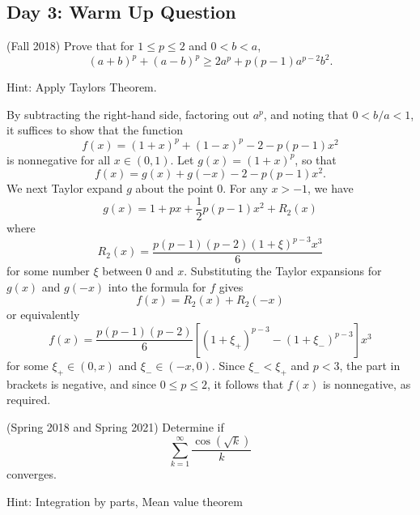 \documentclass[answers]{exam}
\theoremstyle{problemstyle}
\newcommand{\1}[1]{\textbf{1}_{\left[#1\right]}} %
\def\blue{\color{Blue}}
\newcommand{\bnote}[1]{{\blue#1}} %
\begin{document}
\begin{questions}
\section*{Day 3: Warm Up Question}

\question (Fall 2018) 
Prove that for $1\leq p \leq 2$ and $0<b<a$, $$(a+b)^p + (a-b)^p \geq 2a^p + p(p-1)a^{p-2}b^2.$$

\begin{solution}
	\bnote{Hint: Apply Taylors Theorem.}

  By subtracting the right-hand side, factoring out $a^p$, and noting that $0<b/a<1$, it suffices to show that the function
  \begin{equation*}
    f(x) = \left( 1+x \right)^{p} + \left( 1-x \right)^{p} - 2 - p(p-1)x ^{2}
  \end{equation*}
  is nonnegative for all $x\in (0,1)$. Let $g(x) = (1+x)^p$, so that
  \begin{equation*}
    f(x) = g(x)+ g(-x) -2 - p(p-1)x^{2}.
  \end{equation*}
  We next Taylor expand $g$ about the point $0$.
  For any $x>-1$, we have
  \begin{equation*}
    g(x) = 1 + px + \frac{1}{2}p(p-1)x^{2} + R_{2}(x)
  \end{equation*}
  where
  \begin{equation*}
    R_{2}(x)= \frac{p(p-1)(p-2)(1+\xi)^{p-3}x^{3}}{6}
  \end{equation*}
  for some number $\xi$ between $0$ and $x$. Substituting the Taylor expansions for $g(x)$ and $g(-x)$ into the formula for $f$ gives
  \begin{equation*}
    f(x) = R_{2}(x) + R_{2}(-x)
  \end{equation*}
  or equivalently
  \begin{equation*}
    f(x) = \frac{p(p-1)(p-2)}{6} \left[(1+\xi_{+})^{p-3}-(1+\xi_{-})^{p-3}\right]x^{3}
  \end{equation*}
  for some $\xi_{+}\in(0,x)$ and $\xi_{-}\in(-x,0)$. Since $\xi_{-}<\xi_{+}$ and $p<3$, the part in brackets is negative, and since $0\leq p \leq 2$, it follows that $f(x)$ is nonnegative, as required.
\end{solution}

\question (Spring 2018 and Spring 2021)
  Determine if
  \begin{equation*}
    \sum_{k=1}^{\infty}\frac{\cos(\sqrt{k})}{k}
  \end{equation*}
  converges.

\begin{solution}
\bnote{Hint: Integration by parts, Mean value theorem}


\end{solution}
\end{questions}
\end{document}
